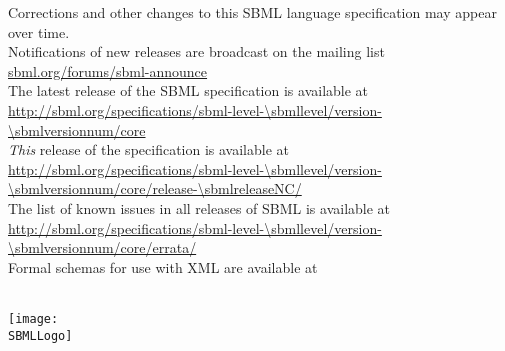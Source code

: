 

\maketitle

\vfill

\begin{center}\sffamily
Corrections and other changes to this SBML language specification may appear over time.\\
Notifications of new releases are broadcast on the mailing list \href{http://www.sbml.org/Forums/sbml-announce}{sbml.org/forums/sbml-announce}\\[10pt]

The latest release of the SBML \thisLV specification is available at\\
\url{http://sbml.org/specifications/sbml-level-\sbmllevel/version-\sbmlversionnum/core}\\[10pt]

\emph{This} release of the specification is available at\\
\url{http://sbml.org/specifications/sbml-level-\sbmllevel/version-\sbmlversionnum/core/release-\sbmlreleaseNC/}\\[10pt]

The list of known issues in all releases of SBML \thisLV is available at\\
\url{http://sbml.org/specifications/sbml-level-\sbmllevel/version-\sbmlversionnum/core/errata/}\\[10pt]

Formal schemas for use with XML are available at\\
\sbmlSchemasURL\\[10pt]
\end{center}

\vfill

\centerline{\texttt{[image: \\SBMLLogo]}}
